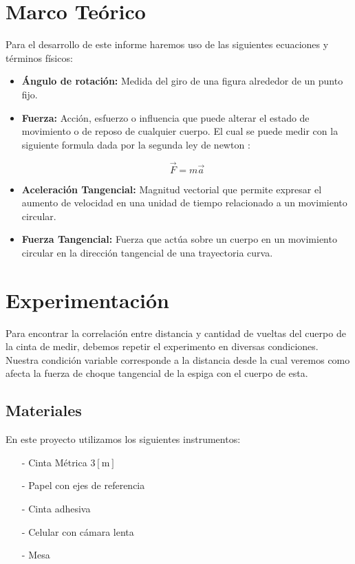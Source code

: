 \documentclass[11pt]{article}
\begin{document}
\section{Marco Teórico}
Para el desarrollo de este informe haremos uso de las siguientes ecuaciones y términos físicos:

\begin{itemize}
   
    \item \textbf{Ángulo de rotación:} Medida del giro de una figura alrededor de un punto fijo.\cite{angulo}
    
    \item \textbf{Fuerza:} Acción, esfuerzo o influencia que puede alterar el estado de movimiento o de reposo de cualquier cuerpo. El cual se puede medir con la siguiente formula dada por la segunda ley de newton \cite{fundamentos} :
        
        \begin{equation}
           \vec{F} = m \vec{a}
           \label{eq:fuerza}
        \end{equation} 
    
    \item \textbf{Aceleración Tangencial:} Magnitud vectorial que permite expresar el aumento de velocidad en una unidad de tiempo relacionado a un movimiento circular. \cite{fundamentos}
    
    \item \textbf{Fuerza Tangencial:} Fuerza que actúa sobre un cuerpo en un movimiento circular en la dirección tangencial de una trayectoria curva. \cite{fundamentos}

\end{itemize}

\section{Experimentación}
Para encontrar la correlación entre distancia y cantidad de vueltas del cuerpo de la cinta de medir, debemos repetir el experimento en diversas condiciones. Nuestra condición variable corresponde a la distancia desde la cual veremos como afecta la fuerza de choque tangencial de la espiga con el cuerpo de esta.

\subsection{Materiales}
En este proyecto utilizamos los siguientes instrumentos:
\begin{itemize}
    \item[-] Cinta Métrica 3$[\text{m}]$
    \item[-] Papel con ejes de referencia
    \item[-] Cinta adhesiva
    \item[-] Celular con cámara lenta
    \item[-] Mesa
\end{itemize}
    
\end{document}
